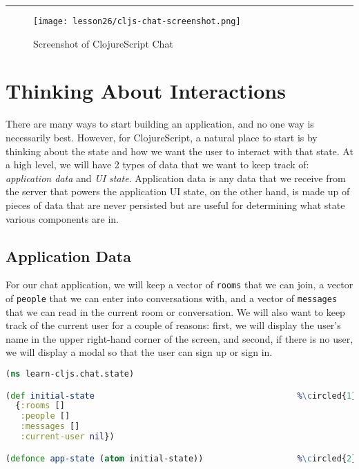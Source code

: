 \documentclass[10pt,twoside,openright]{memoir}
\newcommand*\circled[1]{\tikz[baseline=(char.base)]{
            \node[shape=circle,draw,inner sep=1pt] (char) {#1};}}
\begin{document}
\begin{center}\rule{0.5\linewidth}{0.5pt}\end{center}

\begin{figure}[H]
\caption{Screenshot of ClojureScript Chat}
\centering
\texttt{[image: lesson26/cljs-chat-screenshot.png]}
\end{figure}


\section{Thinking About Interactions}

There are many ways to start building an application, and no one way is
necessarily best. However, for ClojureScript, a natural place to start
is by thinking about the state and how we want the user to interact with
that state. At a high level, we will have 2 types of data that we want
to keep track of: \emph{application data} and \emph{UI state}.
Application data is any data that we receive from the server that powers
the application UI state, on the other hand, is made up of pieces of
data that are never persisted but are useful for determining what state
various components are in.


\subsection{Application Data}

For our chat application, we will keep a vector of \texttt{rooms} that
we can join, a vector of \texttt{people} that we can enter into
conversations with, and a vector of \texttt{messages} that we can read
in the current room or conversation. We will also want to keep track of
the current user for a couple of reasons: first, we will display the
user's name in the upper right-hand corner of the screen, and second, if
there is no user, we will display a modal so that the user can sign up
or sign in.

\begin{lstlisting}[language=Clojure, caption={learn\_clj/chat/state.cljs}]
(ns learn-cljs.chat.state)

(def initial-state                                         %\circled{1}%
  {:rooms []
   :people []
   :messages []
   :current-user nil})

(defonce app-state (atom initial-state))                   %\circled{2}%
\end{lstlisting}
\end{document}
